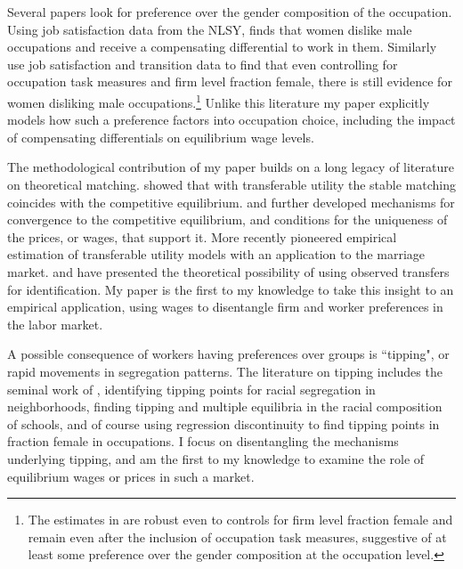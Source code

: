 \documentclass[11pt]{article}
\begin{document}
Several papers look for preference over the gender composition of the occupation. Using job satisfaction data from the NLSY,  finds that women dislike male occupations and receive a compensating differential to work in them. Similarly  use job satisfaction and transition data to find that even controlling for occupation task measures and firm level fraction female, there is still evidence for women disliking male occupations.\footnote{The estimates in  are robust even to controls for firm level fraction female and remain even after the inclusion of occupation task measures, suggestive of at least some preference over the gender composition at the occupation level.} Unlike this literature my paper explicitly models how such a preference factors into occupation choice, including the impact of compensating differentials on equilibrium wage levels.

The methodological contribution of my paper builds on a long legacy of literature on theoretical matching.  showed that with transferable utility the stable matching coincides with the competitive equilibrium.  and  further developed mechanisms for convergence to the competitive equilibrium, and conditions for the uniqueness of the prices, or wages, that support it. More recently  pioneered empirical estimation of transferable utility models with an application to the marriage market.  and  have presented the theoretical possibility of using observed transfers for identification. My paper is the first to my knowledge to take this insight to an empirical application, using wages to disentangle firm and worker preferences in the labor market.

A possible consequence of workers having preferences over groups is ``tipping", or rapid movements in segregation patterns. The literature on tipping includes the seminal work of , identifying tipping points for racial segregation in neighborhoods,  finding tipping and multiple equilibria in the racial composition of schools, and of course  using regression discontinuity to find tipping points in fraction female in occupations. I focus on disentangling the mechanisms underlying tipping, and am the first to my knowledge to examine the role of equilibrium wages or prices in such a market.

\end{document}
